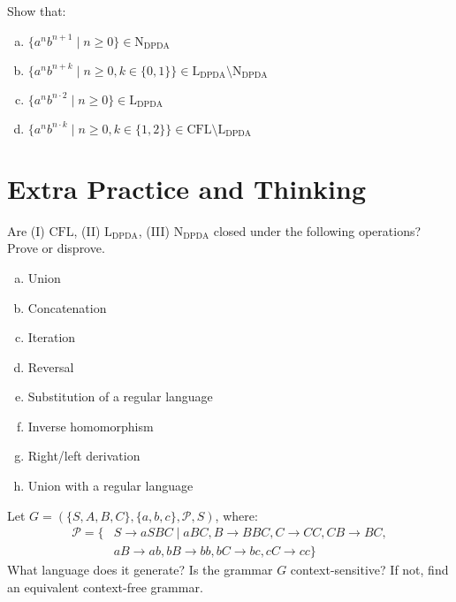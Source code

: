 \documentclass[a4paper,12pt]{amsart}
\begin{document}
\begin{problem}
    Show that:
    \begin{enumerate}[(a)]
        \item $\{a^nb^{n+1}\mid n\geq 0\}\in\mathrm{N_{DPDA}}$
        \item $\{a^nb^{n+k}\mid n\geq 0,k\in\{0,1\}\}\in\mathrm{L_{DPDA}}\setminus\mathrm{N_{DPDA}}$
        \item $\{a^nb^{n\cdot 2}\mid n\geq 0\}\in\mathrm{L_{DPDA}}$
        \item $\{a^nb^{n\cdot k}\mid n\geq 0,k\in\{1,2\}\}\in\mathrm{CFL}\setminus\mathrm{L_{DPDA}}$
    \end{enumerate}
\end{problem}
    

\section*{Extra Practice and Thinking}


\begin{problem}
    Are (I) $\mathrm{CFL}$, (II) $\mathrm{L_{DPDA}}$, (III) $\mathrm{N_{DPDA}}$ closed under the following operations? Prove or disprove.
    \begin{multicols}{2}
        \begin{enumerate}[(a)]
            \item Union
            \item Concatenation
            \item Iteration
            \item Reversal
            \item Substitution of a regular language
            \item Inverse homomorphism
            \item Right/left derivation
            \item Union with a regular language
        \end{enumerate}    
    \end{multicols}    
\end{problem}


\begin{problem}
    Let $G=(\{S,A,B,C\},\{a,b,c\},\mathcal P,S)$, where:
    \begin{align*}
        \mathcal P=\{&S\rightarrow aSBC\mid aBC, B\rightarrow BBC,  C\rightarrow CC, CB\rightarrow BC,\\ 
        &aB\rightarrow ab, bB\rightarrow bb, bC\rightarrow bc, cC\rightarrow cc\}
    \end{align*}
    What language does it generate? Is the grammar $G$ context-sensitive? If not, find an equivalent context-free grammar.
\end{problem}
\end{document}
